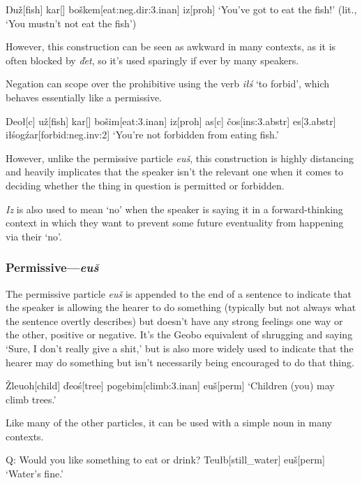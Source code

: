 \documentclass[a4paper,11pt,oneside,openany]{memoir}
\newcommand{\vd}{ď}
\newcommand{\vc}{č}
\newcommand{\vz}{ž}
\newcommand{\vs}{š}
\newcommand{\vZ}{Ž}
\newcommand{\Engma}{Ŋ}
\begin{document}
\ex 
\begingl
\Engma u\vz[fish]
kar[]
bo\vs kem[eat:{\sc neg.dir:3.inan}]
iz[\sc proh]
\glft `You've got to eat the fish!' (lit., `You mustn't not eat the fish')
\endgl
\xe

However, this construction can be seen as awkward in many contexts, as it is often blocked by \textit{\vd et}, so it's used sparingly if ever by many speakers.

Negation can scope over the prohibitive using the verb \textit{i\l\'s} `to forbid', which behaves essentially like a permissive.

\ex 
\begingl
Deo\l[\sc c]
\engma u\vz[fish]
kar[]
bo\vs im[eat:{\sc 3.inan}]
iz[\sc proh]
\nogloss{,}
as[\sc c]
\vc os[\sc ins:3.abstr]
es[\sc 3.abstr]
i\l\'sog\'zar[forbid:{\sc neg.inv:2}]
\glft `You're not forbidden from eating fish.'
\endgl
\xe

However, unlike the permissive particle \textit{eu\vs}, this construction is highly distancing and heavily implicates that the speaker isn't the relevant one when it comes to deciding whether the thing in question is permitted or forbidden.

\textit{Iz} is also used to mean `no' when the speaker is saying it in a forward-thinking context in which they want to prevent some future eventuality from happening via their `no'.

\subsubsection{Permissive---\textit{eu\vs}} 

The permissive particle \textit{eu\vs} is appended to the end of a sentence to indicate that the speaker is allowing the hearer to do something (typically but not always what the sentence overtly describes) but doesn't have any strong feelings one way or the other, positive or negative. It's the Geobo{\engma} equivalent of shrugging and saying `Sure, I don't really give a shit,' but is also more widely used to indicate that the hearer may do something but isn't necessarily being encouraged to do that thing.

\ex
\begingl
\vZ leuoh[child]
\vd eo\'s[tree]
pogebim[climb:{\sc 3.inan}]
eu\vs[\sc perm]
\glft `Children (you) may climb trees.'
\endgl
\xe

Like many of the other particles, it can be used with a simple noun in many contexts.

\ex 
\begingl
\glpreamble
Q: Would you like something to eat or drink?
\endpreamble
{}
Teu\l b[still\_water]
eu\vs[\sc perm]
\glft\phantom{A: }`Water's fine.'
\endgl
\xe
\end{document}
